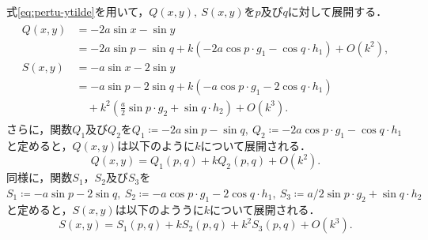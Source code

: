 \documentclass[../main]{subfiles}
\begin{document}
    式\eqref{eq:pertu-ytilde}を用いて，$Q(x,y),\ S(x,y)$を$p$及び$q$に対して展開する．
    \begin{align}
        \begin{split}
            Q(x,y)&=-2a\sin x-\sin y\\
            &=-2a\sin p-\sin q+k(-2a\cos p\cdot g_1-\cos q\cdot h_1)+O(k^2),\\
            S(x,y)&=-a\sin x-2\sin y\\
            &=-a\sin p-2\sin q+k(-a\cos p\cdot g_1-2\cos q\cdot h_1)\\
            &\quad +k^2\left(\frac{a}{2}\sin p\cdot g_2+\sin q\cdot h_2\right)+O(k^3).
        \end{split}
    \end{align}
    さらに，関数$Q_1$及び$Q_2$を$Q_1\coloneqq-2a\sin p-\sin q,\ Q_2\coloneqq -2a\cos p\cdot g_1-\cos q\cdot h_1$と定めると，$Q(x,y)$は以下のように$k$について展開される．
    \begin{equation}
        Q(x,y)=Q_1(p,q)+kQ_2(p,q)+O(k^2).
    \end{equation} 
    同様に，関数$S_1$，$S_2$及び$S_3$を$S_1\coloneqq-a\sin p-2\sin q,\ S_2\coloneqq -a\cos p\cdot g_1-2\cos q\cdot h_1,\ S_3\coloneqq a/2\sin p\cdot g_2+\sin q\cdot h_2$と定めると，$S(x,y)$は以下のよううに$k$について展開される．
    \begin{equation}
        S(x,y)=S_1(p,q)+kS_2(p,q)+k^2S_3(p,q)+O(k^3).
    \end{equation}
\end{document}

